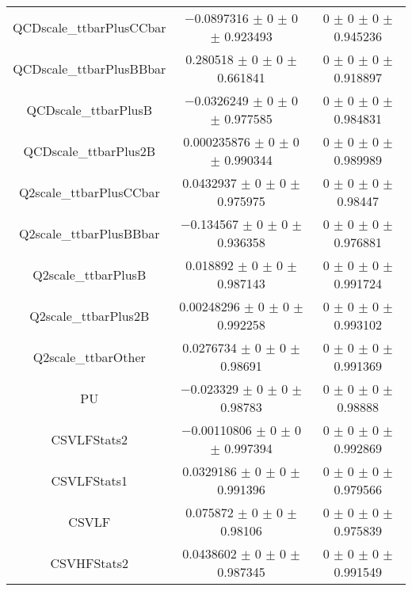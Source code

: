 \begin{table}
\begin{tabular}{ccc}
QCDscale\_ttbarPlusCCbar 	& \num{-0.0897316} $\pm$ \num{0} $\pm$ \num{0} $\pm$ \num{0.923493} 	& \num{0} $\pm$ \num{0} $\pm$ \num{0} $\pm$ \num{0.945236}\\
QCDscale\_ttbarPlusBBbar 	& \num{0.280518} $\pm$ \num{0} $\pm$ \num{0} $\pm$ \num{0.661841} 	& \num{0} $\pm$ \num{0} $\pm$ \num{0} $\pm$ \num{0.918897}\\
QCDscale\_ttbarPlusB 	& \num{-0.0326249} $\pm$ \num{0} $\pm$ \num{0} $\pm$ \num{0.977585} 	& \num{0} $\pm$ \num{0} $\pm$ \num{0} $\pm$ \num{0.984831}\\
QCDscale\_ttbarPlus2B 	& \num{0.000235876} $\pm$ \num{0} $\pm$ \num{0} $\pm$ \num{0.990344} 	& \num{0} $\pm$ \num{0} $\pm$ \num{0} $\pm$ \num{0.989989}\\
Q2scale\_ttbarPlusCCbar 	& \num{0.0432937} $\pm$ \num{0} $\pm$ \num{0} $\pm$ \num{0.975975} 	& \num{0} $\pm$ \num{0} $\pm$ \num{0} $\pm$ \num{0.98447}\\
Q2scale\_ttbarPlusBBbar 	& \num{-0.134567} $\pm$ \num{0} $\pm$ \num{0} $\pm$ \num{0.936358} 	& \num{0} $\pm$ \num{0} $\pm$ \num{0} $\pm$ \num{0.976881}\\
Q2scale\_ttbarPlusB 	& \num{0.018892} $\pm$ \num{0} $\pm$ \num{0} $\pm$ \num{0.987143} 	& \num{0} $\pm$ \num{0} $\pm$ \num{0} $\pm$ \num{0.991724}\\
Q2scale\_ttbarPlus2B 	& \num{0.00248296} $\pm$ \num{0} $\pm$ \num{0} $\pm$ \num{0.992258} 	& \num{0} $\pm$ \num{0} $\pm$ \num{0} $\pm$ \num{0.993102}\\
Q2scale\_ttbarOther 	& \num{0.0276734} $\pm$ \num{0} $\pm$ \num{0} $\pm$ \num{0.98691} 	& \num{0} $\pm$ \num{0} $\pm$ \num{0} $\pm$ \num{0.991369}\\
PU 	& \num{-0.023329} $\pm$ \num{0} $\pm$ \num{0} $\pm$ \num{0.98783} 	& \num{0} $\pm$ \num{0} $\pm$ \num{0} $\pm$ \num{0.98888}\\
CSVLFStats2 	& \num{-0.00110806} $\pm$ \num{0} $\pm$ \num{0} $\pm$ \num{0.997394} 	& \num{0} $\pm$ \num{0} $\pm$ \num{0} $\pm$ \num{0.992869}\\
CSVLFStats1 	& \num{0.0329186} $\pm$ \num{0} $\pm$ \num{0} $\pm$ \num{0.991396} 	& \num{0} $\pm$ \num{0} $\pm$ \num{0} $\pm$ \num{0.979566}\\
CSVLF 	& \num{0.075872} $\pm$ \num{0} $\pm$ \num{0} $\pm$ \num{0.98106} 	& \num{0} $\pm$ \num{0} $\pm$ \num{0} $\pm$ \num{0.975839}\\
CSVHFStats2 	& \num{0.0438602} $\pm$ \num{0} $\pm$ \num{0} $\pm$ \num{0.987345} 	& \num{0} $\pm$ \num{0} $\pm$ \num{0} $\pm$ \num{0.991549}\\

\end{tabular}
\end{table}
